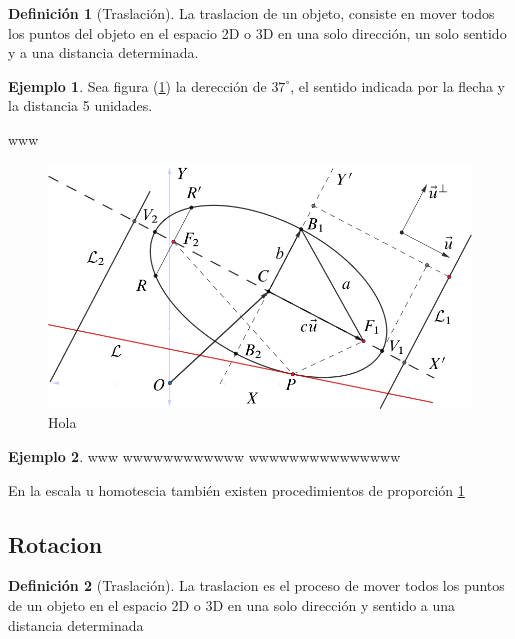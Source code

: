 \documentclass[16pt,]{krantz}
\theoremstyle{definition}
\newtheorem{definition}{Definición}[chapter]
\theoremstyle{definition}
\newtheorem{example}{Ejemplo}[chapter]
\theoremstyle{definition}
\theoremstyle{definition}
\theoremstyle{remark}
\begin{document}
\begin{definition}[Traslación]
\protect\hypertarget{def:traslacion}{}{\label{def:traslacion} {} }La traslacion de un objeto, consiste en mover todos los puntos del objeto en el espacio 2D o 3D en una solo dirección, un solo sentido y a una distancia determinada.
\end{definition}

\begin{example}
\protect\hypertarget{exm:unnamed-chunk-2}{}{\label{exm:unnamed-chunk-2} }Sea figura (\ref{fig:Doge}) la derección de \(37^\circ\), el sentido indicada por la flecha y la distancia 5 unidades.
\end{example}

www

\begin{figure}

{\centering \includegraphics{elipse} 

}

\caption{Hola}\label{fig:Doge}
\end{figure}

\begin{example}
\protect\hypertarget{exm:unnamed-chunk-3}{}{\label{exm:unnamed-chunk-3} }www wwwwwwwwwwww wwwwwwwwwwwwwww
\end{example}

En la escala u homotescia también existen procedimientos de proporción \ref{fig:Doge}

\hypertarget{rotacion}{%
\subsection{Rotacion}\label{rotacion}}

\begin{definition}[Traslación]
\protect\hypertarget{def:rotacion}{}{\label{def:rotacion} {} }La traslacion es el proceso de mover todos los puntos de un objeto en el espacio 2D o 3D en una solo dirección y sentido a una distancia determinada
\end{definition}
\end{document}
